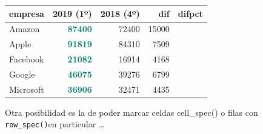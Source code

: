 \documentclass[
]{book}
\newenvironment{Shaded}{\begin{snugshade}}{\end{snugshade}}
\newcommand{\AttributeTok}[1]{\textcolor[rgb]{0.77,0.63,0.00}{#1}}
\newcommand{\ConstantTok}[1]{\textcolor[rgb]{0.00,0.00,0.00}{#1}}
\newcommand{\DecValTok}[1]{\textcolor[rgb]{0.00,0.00,0.81}{#1}}
\newcommand{\FunctionTok}[1]{\textcolor[rgb]{0.00,0.00,0.00}{#1}}
\newcommand{\NormalTok}[1]{#1}
\newcommand{\SpecialCharTok}[1]{\textcolor[rgb]{0.00,0.00,0.00}{#1}}
\newcommand{\StringTok}[1]{\textcolor[rgb]{0.31,0.60,0.02}{#1}}
\begin{document}
\begin{Shaded}
\end{Shaded}

\begin{table}
\centering
\begin{tabular}[t]{l|>{}r|r|r|>{}r}
\hline
empresa & 2019 (1º) & 2018 (4º) & dif & difpct\\
\hline
Amazon & \textcolor{teal}{\textbf{87400}} & 72400 & 15000 & \cellcolor{green}{\textcolor{white}{20.7}}\\
\hline
Apple & \textcolor{teal}{\textbf{91819}} & 84310 & 7509 & \cellcolor{salmon}{\textcolor{white}{8.9}}\\
\hline
Facebook & \textcolor{teal}{\textbf{21082}} & 16914 & 4168 & \cellcolor{green}{\textcolor{white}{24.6}}\\
\hline
Google & \textcolor{teal}{\textbf{46075}} & 39276 & 6799 & \cellcolor{green}{\textcolor{white}{17.3}}\\
\hline
Microsoft & \textcolor{teal}{\textbf{36906}} & 32471 & 4435 & \cellcolor{salmon}{\textcolor{white}{13.7}}\\
\hline
\end{tabular}
\end{table}

Otra posibilidad es la de poder marcar celdas cell\_spec() o filas con \texttt{row\_spec()}en particular \ldots{}
\end{document}
